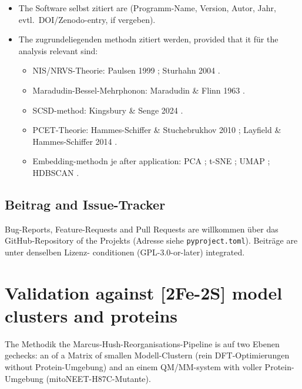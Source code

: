 \documentclass[11pt,a4paper,twoside]{article}
\theoremstyle{remark}
\begin{document}
\begin{itemize}
  \item The Software selbst zitiert are (Programm-Name, Version,
        Autor, Jahr, evtl.\ DOI/Zenodo-entry, if vergeben).
  \item The zugrundeliegenden methodn zitiert werden, provided that it f\"ur
        the analysis relevant sind:
        \begin{itemize}
          \item NIS/NRVS-Theorie: Paulsen 1999 \cite{Paulsen1999};
                Sturhahn 2004 \cite{Sturhahn2004}.
          \item Maradudin-Bessel-Mehrphonon: Maradudin \& Flinn 1963
                \cite{MaradudinFlinn1963}.
          \item SCSD-method: Kingsbury \& Senge 2024
                \cite{Kingsbury2024}.
          \item PCET-Theorie: Hammes-Schiffer \& Stuchebrukhov 2010
                \cite{HammesSchiffer2010};
                Layfield \& Hammes-Schiffer 2014
                \cite{LayfieldHammesSchiffer2014}.
          \item Embedding-methodn je after application: PCA
                \cite{Pearson1901}; t-SNE \cite{vanDerMaaten2008};
                UMAP \cite{McInnes2018}; HDBSCAN \cite{Campello2013}.
        \end{itemize}
\end{itemize}

\subsection{Beitrag and Issue-Tracker}

Bug-Reports, Feature-Requests and Pull Requests are willkommen \"uber
das GitHub-Repository of the Projekts (Adresse siehe
\texttt{pyproject.toml}). Beitr\"age are unter denselben Lizenz-
conditionen (GPL-3.0-or-later) integrated.


\section{Validation against [2Fe-2S] model clusters and proteins}
\label{sec:validierung}

The Methodik the Marcus-Hush-Reorganisations-Pipeline is auf two
Ebenen gechecks: an of a Matrix of smallen Modell-Clustern (rein
DFT-Optimierungen without Protein-Umgebung) and an einem
QM/MM-system with voller Protein-Umgebung (mitoNEET-H87C-Mutante).
\end{document}
